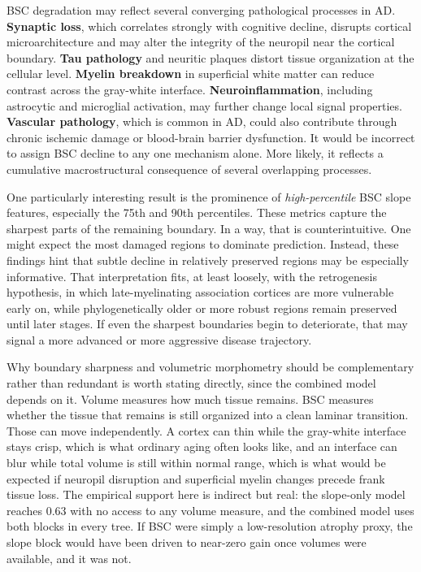 \documentclass[blue]{ludusofficial}  %
\begin{document}
BSC degradation may reflect several converging pathological processes in AD. \textbf{Synaptic loss}, which correlates strongly with cognitive decline, disrupts cortical microarchitecture and may alter the integrity of the neuropil near the cortical boundary. \textbf{Tau pathology} and neuritic plaques distort tissue organization at the cellular level. \textbf{Myelin breakdown} in superficial white matter can reduce contrast across the gray-white interface. \textbf{Neuroinflammation}, including astrocytic and microglial activation, may further change local signal properties. \textbf{Vascular pathology}, which is common in AD, could also contribute through chronic ischemic damage or blood-brain barrier dysfunction. It would be incorrect to assign BSC decline to any one mechanism alone. More likely, it reflects a cumulative macrostructural consequence of several overlapping processes.

One particularly interesting result is the prominence of \textit{high-percentile} BSC slope features, especially the 75th and 90th percentiles. These metrics capture the sharpest parts of the remaining boundary. In a way, that is counterintuitive. One might expect the most damaged regions to dominate prediction. Instead, these findings hint that subtle decline in relatively preserved regions may be especially informative. That interpretation fits, at least loosely, with the retrogenesis hypothesis, in which late-myelinating association cortices are more vulnerable early on, while phylogenetically older or more robust regions remain preserved until later stages. If even the sharpest boundaries begin to deteriorate, that may signal a more advanced or more aggressive disease trajectory.

Why boundary sharpness and volumetric morphometry should be complementary rather than redundant is worth stating directly, since the combined model depends on it. Volume measures how much tissue remains. BSC measures whether the tissue that remains is still organized into a clean laminar transition. Those can move independently. A cortex can thin while the gray-white interface stays crisp, which is what ordinary aging often looks like, and an interface can blur while total volume is still within normal range, which is what would be expected if neuropil disruption and superficial myelin changes precede frank tissue loss. The empirical support here is indirect but real: the slope-only model reaches 0.63 with no access to any volume measure, and the combined model uses both blocks in every tree. If BSC were simply a low-resolution atrophy proxy, the slope block would have been driven to near-zero gain once volumes were available, and it was not.
\end{document}
